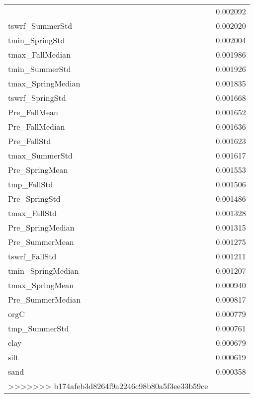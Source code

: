 \begin{tabular}{lr}
\begin{tabular}{rrrrr}
Pre_SummerStd & 0.002092 \\
tswrf_SummerStd & 0.002020 \\
tmin_SpringStd & 0.002004 \\
tmax_FallMedian & 0.001986 \\
tmin_SummerStd & 0.001926 \\
tmax_SpringMedian & 0.001835 \\
tswrf_SpringStd & 0.001668 \\
Pre_FallMean & 0.001652 \\
Pre_FallMedian & 0.001636 \\
Pre_FallStd & 0.001623 \\
tmax_SummerStd & 0.001617 \\
Pre_SpringMean & 0.001553 \\
tmp_FallStd & 0.001506 \\
Pre_SpringStd & 0.001486 \\
tmax_FallStd & 0.001328 \\
Pre_SpringMedian & 0.001315 \\
Pre_SummerMean & 0.001275 \\
tswrf_FallStd & 0.001211 \\
tmin_SpringMedian & 0.001207 \\
tmax_SpringMean & 0.000940 \\
Pre_SummerMedian & 0.000817 \\
orgC & 0.000779 \\
tmp_SummerStd & 0.000761 \\
clay & 0.000679 \\
silt & 0.000619 \\
sand & 0.000358 \\
>>>>>>> b174afeb3d8264f9a2246c98b80a5f3ee33b59ce
\bottomrule
\end{tabular}
